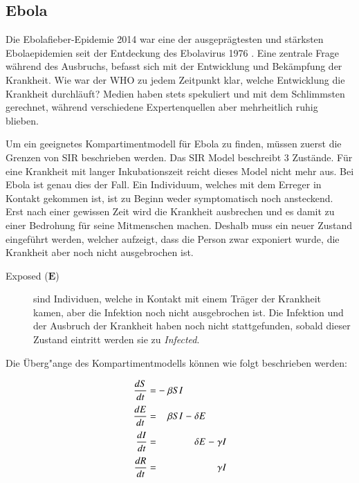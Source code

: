 \begin{refsection}
\section{Ebola}
%
Die Ebolafieber-Epidemie 2014  war eine der ausgeprägtesten und stärksten Ebolaepidemien seit der Entdeckung des Ebolavirus 1976 \cite{sir:ebola_history}.
Eine zentrale Frage während des Ausbruchs, befasst sich mit der Entwicklung und Bekämpfung der Krankheit. Wie war der WHO zu jedem Zeitpunkt klar, welche Entwicklung die Krankheit durchläuft?
%
%
Medien haben stets spekuliert und mit dem Schlimmsten gerechnet, während verschiedene Expertenquellen aber mehrheitlich ruhig blieben. 


Um ein geeignetes Kompartimentmodell für Ebola zu finden, müssen zuerst die Grenzen von SIR beschrieben werden.
Das SIR Model beschreibt 3 Zustände. 
Für eine Krankheit mit langer Inkubationszeit reicht dieses Model nicht mehr aus. 
Bei Ebola ist genau dies der Fall.
Ein Individuum, welches mit dem Erreger in Kontakt gekommen ist, ist zu Beginn weder symptomatisch noch ansteckend. 
Erst nach einer gewissen Zeit wird die Krankheit ausbrechen und es damit zu einer Bedrohung für seine Mitmenschen machen. 
Deshalb muss ein neuer Zustand eingeführt werden, welcher aufzeigt, dass die Person zwar exponiert wurde, die Krankheit aber noch nicht ausgebrochen ist.
\begin{figure}[ht]
  \centering
  
\end{figure}
\begin{description}
  \item [Exposed ($\mathbf{E}$)] sind Individuen, welche in Kontakt mit einem Träger der Krankheit kamen, aber die Infektion noch nicht ausgebrochen ist. Die Infektion und der Ausbruch der Krankheit haben noch nicht stattgefunden, sobald dieser Zustand eintritt werden sie zu \emph{Infected}.
%
\end{description}
Die Überg"ange des Kompartimentmodells können wie folgt beschrieben werden:
\[
\arraycolsep=1.4pt\def\arraystretch{2.2}
  \begin{array}{rccrcrcr}
   \displaystyle\frac{dS}{dt} & = &-&\beta S I& &        & &        \\
   \displaystyle\frac{dE}{dt} & = & &\beta S I&-&\delta E& &        \\
   \displaystyle\frac{dI}{dt} & = & &         & &\delta E&-&\gamma I\\
   \displaystyle\frac{dR}{dt} & = & &         & &        & &\gamma I

\end{array}\]
\end{refsection}
